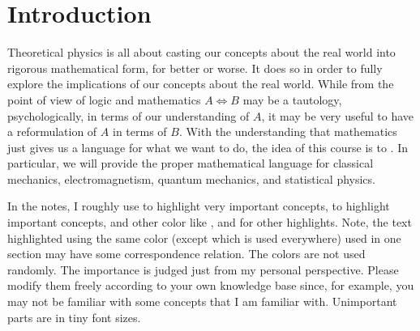 \documentclass{article}
\begin{document}
\section{Introduction}
Theoretical physics is all about casting our concepts about the real world into rigorous mathematical form, for better or worse. 
It does so in order to fully explore the implications of our concepts about the real world. While from the point of view of logic and mathematics $A\Leftrightarrow B$ may be a tautology, psychologically, in terms of our understanding of $A$, it may be very useful to have a reformulation of $A$ in terms of $B$. With the understanding that mathematics just gives us a language for what we want to do, the idea of this course is to . In particular, we will provide the proper mathematical language for classical mechanics, electromagnetism, quantum mechanics, and statistical physics.

In the notes,  I roughly use  to highlight very important concepts,  to highlight important concepts, and other color like ,  and  for other highlights. Note, the text highlighted using the same color (except  which is used everywhere) used in one section may have some correspondence relation. The colors are not used randomly. The importance is judged just from my personal perspective. Please modify them freely according to your own knowledge base since, for example, you may not be familiar with some concepts that I am familiar with. Unimportant parts are in tiny font sizes. 
\end{document}
